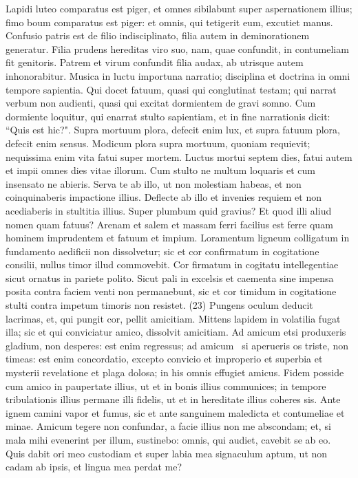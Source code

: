 \begin{biblechapter}  
\verse Lapidi luteo comparatus est piger, et omnes sibilabunt super aspernationem illius; 
\verse fimo boum comparatus est piger: et omnis, qui tetigerit eum, excutiet manus. 
\verse Confusio patris est de filio indisciplinato, filia autem in deminorationem generatur. 
\verse Filia prudens hereditas viro suo, nam, quae confundit, in contumeliam fit genitoris. 
\verse Patrem et virum confundit filia audax, ab utrisque autem inhonorabitur. 
\verse Musica in luctu importuna narratio; disciplina et doctrina in omni tempore sapientia. 
\verse Qui docet fatuum, quasi qui conglutinat testam; 
\verse qui narrat verbum non audienti, quasi qui excitat dormientem de gravi somno. 
\verse Cum dormiente loquitur, qui enarrat stulto sapientiam, et in fine narrationis dicit: “Quis est hic?". 
\verse Supra mortuum plora, defecit enim lux, et supra fatuum plora, defecit enim sensus. 
\verse Modicum plora supra mortuum, quoniam requievit; 
\verse nequissima enim vita fatui super mortem. 
\verse Luctus mortui septem dies, fatui autem et impii omnes dies vitae illorum. 
\verse Cum stulto ne multum loquaris et cum insensato ne abieris. 
\verse Serva te ab illo, ut non molestiam habeas, et non coinquinaberis impactione illius. 
\verse Deflecte ab illo et invenies requiem et non acediaberis in stultitia illius. 
\verse Super plumbum quid gravius? Et quod illi aliud nomen quam fatuus? 
\verse Arenam et salem et massam ferri facilius est ferre quam hominem imprudentem et fatuum et impium. 
\verse Loramentum ligneum colligatum in fundamento aedificii non dissolvetur; sic et cor confirmatum in cogitatione consilii, nullus timor illud commovebit. 
\verse Cor firmatum in cogitatu intellegentiae sicut ornatus in pariete polito. 
\verse Sicut pali in excelsis et caementa sine impensa posita contra faciem venti non permanebunt, 
\verse sic et cor timidum in cogitatione stulti contra impetum timoris non resistet. (23) 
\verse Pungens oculum deducit lacrimas, et, qui pungit cor, pellit amicitiam. 
\verse Mittens lapidem in volatilia fugat illa; sic et qui conviciatur amico, dissolvit amicitiam. 
\verse Ad amicum etsi produxeris gladium, non desperes: est enim regressus; ad amicum  
\verse si aperueris os triste, non timeas: est enim concordatio, excepto convicio et improperio et superbia et mysterii revelatione et plaga dolosa; in his omnis effugiet amicus. 
\verse Fidem posside cum amico in paupertate illius, ut et in bonis illius communices; 
\verse in tempore tribulationis illius permane illi fidelis, ut et in hereditate illius coheres sis. 
\verse Ante ignem camini vapor et fumus, sic et ante sanguinem maledicta et contumeliae et minae. 
\verse Amicum tegere non confundar, a facie illius non me abscondam; et, si mala mihi evenerint per illum, sustinebo: 
\verse omnis, qui audiet, cavebit se ab eo. 
\verse Quis dabit ori meo custodiam et super labia mea signaculum aptum, ut non cadam ab ipsis, et lingua mea perdat me? 
\end{biblechapter}


